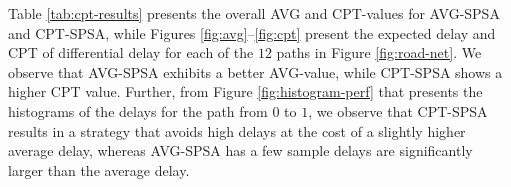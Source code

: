 Table \ref{tab:cpt-results} presents the overall AVG and CPT-values for AVG-SPSA and CPT-SPSA, while Figures \ref{fig:avg}--\ref{fig:cpt} present the expected delay and CPT of differential delay for each of the $12$ paths in Figure \ref{fig:road-net}.  
We observe that AVG-SPSA exhibits a better AVG-value, while CPT-SPSA shows a higher CPT value. 
Further, from Figure \ref{fig:histogram-perf} that presents the histograms of the delays for the path from $0$ to $1$, we observe that CPT-SPSA results in a strategy that avoids high delays at the cost of a slightly higher average delay, whereas AVG-SPSA has a few sample delays are significantly larger than the average delay. 



